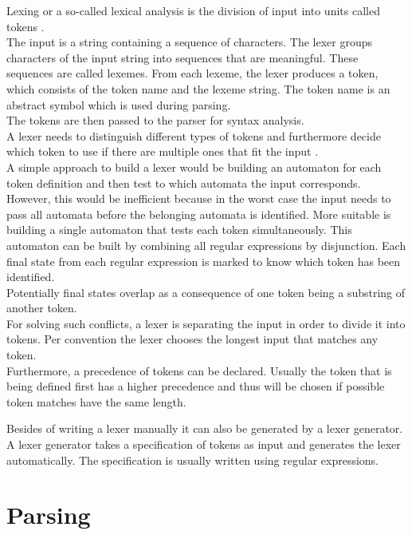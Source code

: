 Lexing or a so-called lexical analysis is the division of input into units called tokens \cite{LexYacc.1992}.\\
The input is a string containing a sequence of characters.
The lexer groups characters of the input string into sequences that are meaningful. These sequences are called lexemes. From each lexeme, the lexer produces a token, which consists of the token name and the lexeme string. The token name is an abstract symbol which is used during parsing. \cite{Aho.2007} \\
The tokens are then passed to the parser for syntax analysis.\\
A lexer needs to distinguish different types of tokens and furthermore decide which token to use if there are multiple ones that fit the input \cite{Mogensen.2017}.\\
A simple approach to build a lexer would be building an automaton for each token definition and then test to which automata the input corresponds.\\
However, this would be inefficient because in the worst case the input needs to pass all automata before the belonging automata is identified.
More suitable is building a single automaton that tests each token simultaneously.
This automaton can be built by combining all regular expressions by disjunction.
Each final state from each regular expression is marked to know which token has been identified.\\
Potentially final states overlap as a consequence of one token being a substring of another token. \\
For solving such conflicts, a lexer is separating the input in order to divide it into tokens.
Per convention the lexer chooses the longest input that matches any token. \cite{Mogensen.2017} \\
Furthermore, a precedence of tokens can be declared. Usually the token that is being defined first has a higher precedence and thus will be chosen if possible token matches have the same length. \cite{Mogensen.2017}

Besides of writing a lexer manually it can also be generated by a lexer generator. A lexer generator takes a specification of tokens as input and generates the lexer automatically. 
The specification is usually written using regular expressions. 

\section{Parsing}\label{sec:BackgroundParser}

